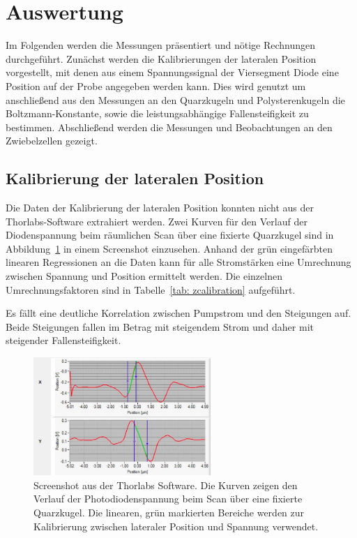 \section{Auswertung}
Im Folgenden werden die Messungen präsentiert und nötige Rechnungen durchgeführt. Zunächst
werden die Kalibrierungen der lateralen Position vorgestellt, mit denen aus einem Spannungssignal der
Viersegment Diode eine Position auf der Probe angegeben werden kann. Dies wird genutzt um anschließend
aus den Messungen an den Quarzkugeln und Polysterenkugeln die Boltzmann-Konstante, sowie die leistungsabhängige
Fallensteifigkeit zu bestimmen. Abschließend werden die Messungen und Beobachtungen an den Zwiebelzellen
gezeigt.

\subsection{Kalibrierung der lateralen Position}
Die Daten der Kalibrierung der lateralen Position konnten nicht aus der Thorlabs-Software extrahiert werden. Zwei
Kurven für den Verlauf der Diodenspannung beim räumlichen Scan über eine fixierte Quarzkugel sind in Abbildung~\ref{fig: calibration}
in einem Screenshot einzusehen. Anhand der grün eingefärbten linearen Regressionen an die Daten kann für alle Stromstärken eine
Umrechnung zwischen Spannung und Position ermittelt werden. Die einzelnen Umrechnungsfaktoren sind in Tabelle~\ref{tab: zcalibration}
aufgeführt.

Es fällt eine deutliche Korrelation zwischen Pumpstrom und den Steigungen auf. Beide Steigungen fallen
im Betrag mit steigendem Strom und daher mit steigender Fallensteifigkeit.

\begin{figure}
  \centering
  \includegraphics[width = 0.6\textwidth]{../analysis/data/i_quarz/70mA/position_calibration_70mA.png}
  \caption{Screenshot aus der Thorlabs Software. Die Kurven zeigen den Verlauf der Photodiodenspannung beim Scan über
  eine fixierte Quarzkugel. Die linearen, grün markierten Bereiche werden zur Kalibrierung zwischen lateraler Position und Spannung verwendet.}
  \label{fig: calibration}
\end{figure}


